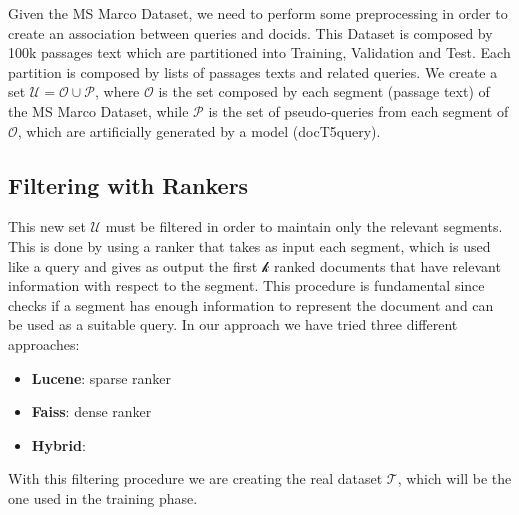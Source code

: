 Given the MS Marco Dataset, we need to perform some preprocessing in order to create an association between queries and docids.
This Dataset is composed by 100k passages text which are partitioned into Training, Validation and Test. Each partition is composed by lists of passages texts and related queries.
We create a set $\mathcal{U} = \mathcal{O} \cup \mathcal{P}$, where $\mathcal{O}$ is the set composed by each segment (passage text) of the MS Marco Dataset, while $\mathcal{P}$ is the set of pseudo-queries from each segment of $\mathcal{O}$, which are artificially generated by a model (docT5query).

\subsection{Filtering with Rankers}
This new set $\mathcal{U}$ must be filtered in order to maintain only the relevant segments. 
This is done by using a ranker that takes as input each segment, which is used like a query and gives as output the first $\mathcal{k}$ ranked documents that have relevant information with respect to the segment.
This procedure is fundamental since checks if a segment has enough information to represent the document and can be used as a suitable query.
In our approach we have tried three different approaches:
\begin{itemize}
    \item \textbf{Lucene}: sparse ranker
    \item \textbf{Faiss}: dense ranker 
    \item \textbf{Hybrid}:
\end{itemize}
With this filtering procedure we are creating the real dataset $\mathcal{T}$, which will be the one used in the training phase. 